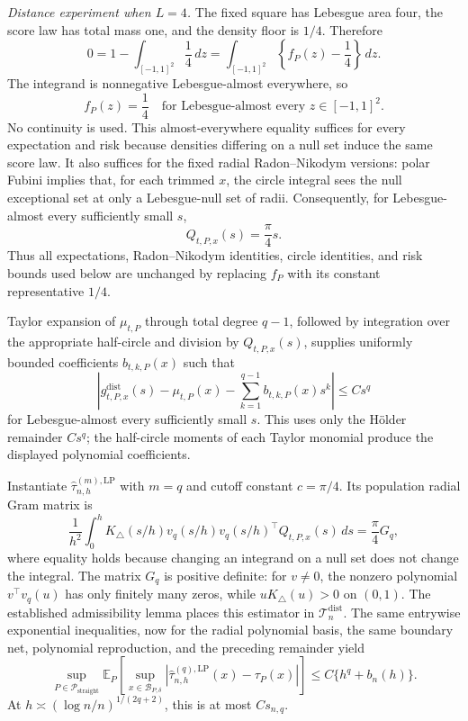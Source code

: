\emph{Distance experiment when \(L=4\).}  The fixed square has Lebesgue area four, the score law has total mass one, and the density floor is \(1/4\).  Therefore
\[
 0=1-\int_{[-1,1]^2}\frac14\,dz
 =\int_{[-1,1]^2}\left\{f_P(z)-\frac14\right\}\,dz.
\]
The integrand is nonnegative Lebesgue-almost everywhere, so
\[
 f_P(z)=\frac14
 \quad\text{for Lebesgue-almost every }z\in[-1,1]^2.
\]
No continuity is used.  This almost-everywhere equality suffices for every expectation and risk because densities differing on a null set induce the same score law.  It also suffices for the fixed radial Radon--Nikodym versions: polar Fubini implies that, for each trimmed \(x\), the circle integral sees the null exceptional set at only a Lebesgue-null set of radii.  Consequently, for Lebesgue-almost every sufficiently small \(s\),
\[
 Q_{t,P,x}(s)=\frac{\pi}{4}s.
\]
Thus all expectations, Radon--Nikodym identities, circle identities, and risk bounds used below are unchanged by replacing \(f_P\) with its constant representative \(1/4\).

Taylor expansion of \(\mu_{t,P}\) through total degree \(q-1\), followed by integration over the appropriate half-circle and division by \(Q_{t,P,x}(s)\), supplies uniformly bounded coefficients \(b_{t,k,P}(x)\) such that
\[
 \left|g^{\mathrm{dist}}_{t,P,x}(s)-\mu_{t,P}(x)
 -\sum_{k=1}^{q-1}b_{t,k,P}(x)s^k\right|
 \leq Cs^q
\]
for Lebesgue-almost every sufficiently small \(s\).  This uses only the H\"older remainder \(Cs^q\); the half-circle moments of each Taylor monomial produce the displayed polynomial coefficients.

Instantiate \(\widehat\tau^{(m),\mathrm{LP}}_{n,h}\) with \(m=q\) and cutoff constant \(c=\pi/4\).  Its population radial Gram matrix is
\[
 \frac1{h^2}\int_0^h K_\triangle(s/h)v_q(s/h)v_q(s/h)^\top
 Q_{t,P,x}(s)\,ds
 =\frac\pi4 G_q,
\]
where equality holds because changing an integrand on a null set does not change the integral.  The matrix \(G_q\) is positive definite: for \(v\neq0\), the nonzero polynomial \(v^\top v_q(u)\) has only finitely many zeros, while \(uK_\triangle(u)>0\) on \((0,1)\).  The established admissibility lemma places this estimator in \(\mathcal T_n^{\mathrm{dist}}\).  The same entrywise exponential inequalities, now for the radial polynomial basis, the same boundary net, polynomial reproduction, and the preceding remainder yield
\[
 \sup_{P\in\mathcal P_{\mathrm{straight}}}
 \mathbb E_P\!\left[
 \sup_{x\in\mathcal B_{P,\delta}}
 |\widehat\tau^{(q),\mathrm{LP}}_{n,h}(x)-\tau_P(x)|
 \right]
 \leq C\{h^q+b_n(h)\}.
\]
At \(h\asymp(\log n/n)^{1/(2q+2)}\), this is at most \(Cs_{n,q}\).

